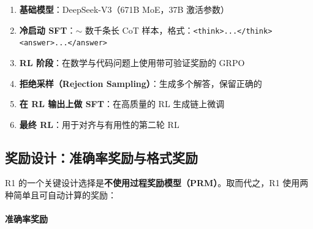 \newpage
\begin{keybox}[R1 训练流程总结]
\begin{enumerate}
  \item \textbf{基础模型}：DeepSeek-V3（671B MoE，37B 激活参数）
  \item \textbf{冷启动 SFT}：$\sim$ 数千条长 CoT 样本，格式：\texttt{<think>...</think><answer>...</answer>}
  \item \textbf{RL 阶段}：在数学与代码问题上使用带可验证奖励的 GRPO
  \item \textbf{拒绝采样（Rejection Sampling）}：生成多个解答，保留正确的
  \item \textbf{在 RL 输出上做 SFT}：在高质量的 RL 生成链上微调
  \item \textbf{最终 RL}：用于对齐与有用性的第二轮 RL
\end{enumerate}
\end{keybox}

\subsection{奖励设计：准确率奖励与格式奖励}
\label{reward-design-accuracy-and-format-rewards}

R1 的一个关键设计选择是\textbf{不使用过程奖励模型（PRM）}。取而代之，R1 使用两种简单且可自动计算的奖励：

\paragraph{准确率奖励}
\label{accuracy-reward}

